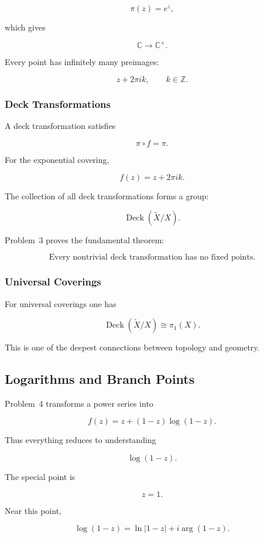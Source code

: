 \documentclass[12pt,a4paper]{article}
\theoremstyle{notespace}
\begin{document}
\[
\pi(z)=e^z,
\]

which gives

\[
\mathbb C
\longrightarrow
\mathbb C^\times.
\]

Every point has infinitely many preimages:

\[
z+2\pi i k,
\qquad
k\in\mathbb Z.
\]

\subsubsection*{Deck Transformations}

A deck transformation satisfies

\[
\pi\circ f=\pi.
\]

For the exponential covering,

\[
f(z)=z+2\pi i k.
\]

The collection of all deck transformations forms a group:

\[
\operatorname{Deck}(\widetilde X/X).
\]

Problem~3 proves the fundamental theorem:

\[
\boxed{
	\text{Every nontrivial deck transformation has no fixed points.}
}
\]

\subsubsection*{Universal Coverings}

For universal coverings one has

\[
\operatorname{Deck}(\widetilde X/X)
\cong
\pi_1(X).
\]

This is one of the deepest connections between topology and geometry.

\bigskip

\subsection{ Logarithms and Branch Points}

Problem~4 transforms a power series into

\[
f(z)
=
z+(1-z)\log(1-z).
\]

Thus everything reduces to understanding

\[
\log(1-z).
\]

The special point is

\[
z=1.
\]

Near this point,

\[
\log(1-z)
=
\ln|1-z|
+
i\arg(1-z).
\]
\end{document}
